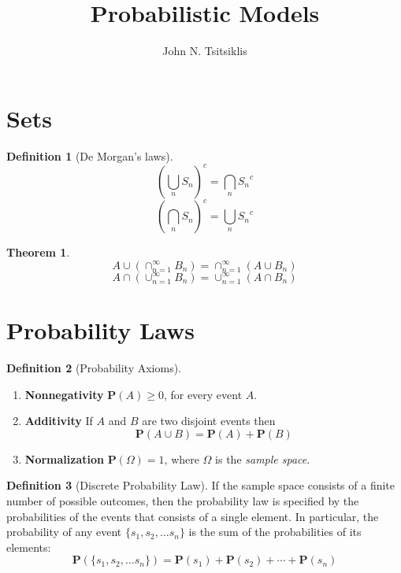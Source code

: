 \documentclass{tufte-handout}
\author{John N. Tsitsiklis}
\title{Probabilistic Models}
\theoremstyle{definition} \newtheorem{definition}{Definition}
\newtheorem{theorem}{Theorem}
\theoremstyle{remark} \newtheorem{remark}{Remark}
\newcommand{\prob}[1]{\mathbf{P}\left(#1\right)}
\begin{document}
\maketitle

\section{Sets}
\begin{definition}[De Morgan's laws]
  \begin{equation}
    \left( \bigcup_n S_n \right)^c = \bigcap_n {S_n}^c
  \end{equation}
  \begin{equation}
    \left( \bigcap_n S_n \right)^c = \bigcup_n {S_n}^c
  \end{equation}
\end{definition}

\begin{theorem}
  \begin{equation}
    A \cup \left( \cap_{n=1}^{\infty} B_n\right) =
    \cap_{n=1}^{\infty} \left( A \cup B_n \right)
  \end{equation}
  \begin{equation}
    A \cap \left( \cup_{n=1}^{\infty} B_n\right) =
    \cup_{n=1}^{\infty} \left( A \cap B_n \right)
  \end{equation}

\end{theorem}

\section{Probability Laws}
\begin{definition}[Probability Axioms]\ \\
  \begin{enumerate}
  \item \textbf{Nonnegativity} $\prob{A} \geq 0$, for every event
    $A$.
  \item \textbf{Additivity} If $A$ and $B$ are two disjoint events then
    \begin{equation*}
      \prob{A \cup B} = \prob{A} + \prob{B}
    \end{equation*}
  \item \textbf{Normalization} $\prob{\Omega} = 1$, where $\Omega$ is
    the \emph{sample space}.
  \end{enumerate}
\end{definition}

\begin{definition}[Discrete Probability Law]
  If the sample space consists of a finite number of possible outcomes,
  then the probability law is specified by the probabilities of the
  events that consists of a single element. In particular, the probability
  of any event $\{s_1, s_2, \ldots s_n\}$ is the sum of the probabilities
  of its elements:
  \begin{equation*}
    \prob{\{s_1, s_2, \ldots s_n\}} = \prob{s_1} + \prob{s_2} + \cdots +
    \prob{s_n}
  \end{equation*}
\end{definition}
\end{document}
